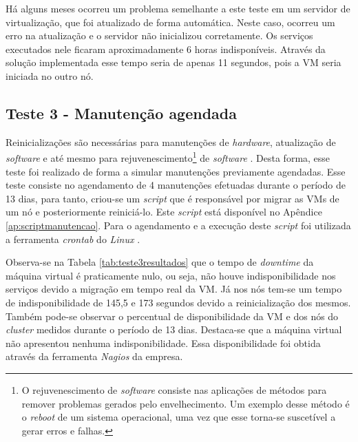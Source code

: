 Há alguns meses ocorreu um problema semelhante a este teste em um servidor de virtualização, que foi atualizado de forma automática. Neste caso, 
ocorreu um erro na atualização e o servidor não inicializou corretamente. Os serviços executados nele ficaram aproximadamente 
6 horas indisponíveis. Através da solução implementada esse tempo seria de apenas 11 segundos, pois a \ac{VM} seria iniciada no outro nó. 

\subsection{Teste 3 - Manutenção agendada}


Reinicializações são necessárias para manutenções de \textit{hardware}, atualização de \textit{software} e até mesmo para 
rejuvenescimento\footnote{O rejuvenescimento de \textit{software} consiste nas aplicações de métodos para remover problemas gerados pelo 
envelhecimento. Um exemplo desse método é o \textit{reboot} de um sistema operacional, uma vez que esse torna-se suscetível a gerar erros e 
falhas.} de \textit{software} \cite{melo2014}. Desta forma, esse teste foi realizado de forma a simular manutenções previamente agendadas.
Esse teste consiste no agendamento de 4 manutenções efetuadas durante o período de 13 dias, para tanto, criou-se um \textit{script} que é 
responsável por migrar as \acp{VM} de um nó e posteriormente reiniciá-lo. Este \textit{script} está disponível no Apêndice 
\ref{ap:scriptmanutencao}. Para o agendamento e a execução deste \textit{script} foi utilizada a ferramenta \textit{crontab} do \textit{Linux}
\cite{neves2008}. 

Observa-se na Tabela \ref{tab:teste3resultados} que o tempo de \textit{downtime} da máquina virtual é praticamente nulo, ou seja, 
não houve indisponibilidade nos serviços devido a migração em tempo real da \ac{VM}. 
Já nos nós tem-se um tempo de indisponibilidade de 145,5 e 173 segundos devido a reinicialização dos mesmos.
Também pode-se observar o percentual de disponibilidade da \ac{VM} e dos nós do \textit{cluster} medidos durante o período de 13 dias.
Destaca-se que a máquina virtual não apresentou nenhuma indisponibilidade. Essa disponibilidade foi obtida através da ferramenta 
\textit{Nagios} \cite{nagios} da empresa.

